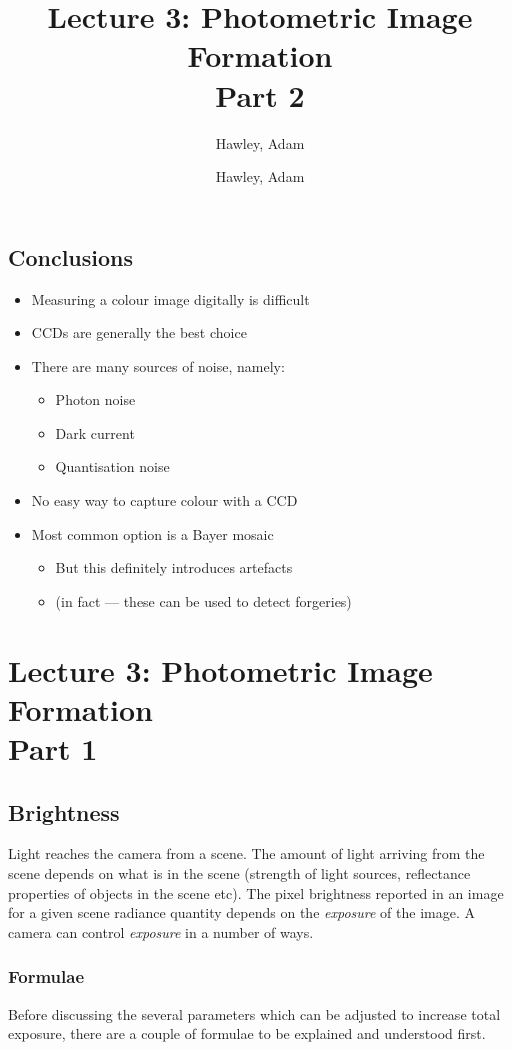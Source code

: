 \documentclass{article}\author{Hawley, Adam}
\begin{document}
\subsection{Conclusions}
\begin{itemize}
	\item Measuring a colour image digitally is difficult
	\item CCDs are generally the best choice
	\item There are many sources of noise, namely:
		\begin{itemize}
			\item Photon noise
			\item Dark current
			\item Quantisation noise
		\end{itemize}
	\item No easy way to capture colour with a CCD
	\item Most common option is a Bayer mosaic
		\begin{itemize}
			\item But this definitely introduces artefacts
			\item (in fact --- these can be used to detect forgeries)
		\end{itemize}
\end{itemize}
\author{Hawley, Adam}
\title{Lecture 3: Photometric Image Formation\\Part 2}

\maketitle
\section{Lecture 3: Photometric Image Formation\\Part 1}
\newpage

\subsection{Brightness}
Light reaches the camera from a scene. 
The amount of light arriving from the scene depends on what is in the scene (strength of light sources, reflectance properties of objects in the scene etc). 
The pixel brightness reported in an image for a given scene radiance quantity depends on the {\it exposure} of the image. 
A camera can control {\it exposure} in a number of ways.

\subsubsection{Formulae}
Before discussing the several parameters which can be adjusted to increase total exposure, there are a couple of formulae to be explained and understood first.
\end{document}
